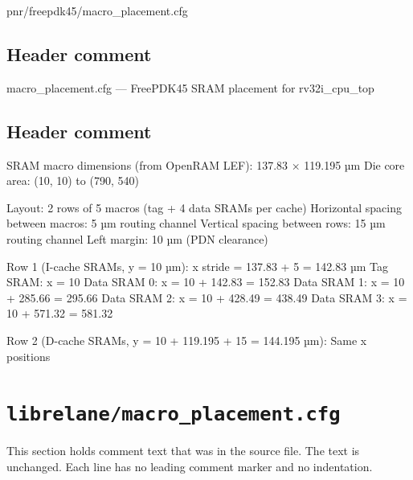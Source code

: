 \begin{relocated}{pnr/freepdk45/macro_placement.cfg}

\subsection*{Header comment}

\begin{textblock}
macro_placement.cfg — FreePDK45 SRAM placement for rv32i_cpu_top
\end{textblock}

\subsection*{Header comment}

\begin{textblock}
SRAM macro dimensions (from OpenRAM LEF): 137.83 × 119.195 µm
Die core area: (10, 10) to (790, 540)

Layout: 2 rows of 5 macros (tag + 4 data SRAMs per cache)
Horizontal spacing between macros: 5 µm routing channel
Vertical spacing between rows: 15 µm routing channel
Left margin: 10 µm (PDN clearance)

Row 1 (I-cache SRAMs, y = 10 µm):
  x stride = 137.83 + 5 = 142.83 µm
  Tag SRAM:    x = 10
  Data SRAM 0: x = 10 + 142.83 = 152.83
  Data SRAM 1: x = 10 + 285.66 = 295.66
  Data SRAM 2: x = 10 + 428.49 = 438.49
  Data SRAM 3: x = 10 + 571.32 = 581.32

Row 2 (D-cache SRAMs, y = 10 + 119.195 + 15 = 144.195 µm):
  Same x positions
\end{textblock}

\end{relocated}

\section{\texttt{librelane/macro\_placement.cfg}}\label{tm:pd:librelane-macro-placement-cfg}

This section holds comment text that was in the source file. The text is unchanged. Each line has no leading comment marker and no indentation.

